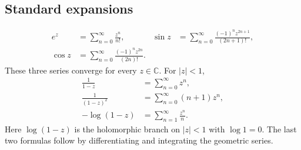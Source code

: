 \documentclass[11pt,a4paper]{article}
\theoremstyle{definition}
\theoremstyle{plain}
\newcommand{\C}{\mathbb{C}}
\begin{document}
\subsection{Standard expansions}
\begin{equation}\label{eq:17}
\begin{aligned}
 e^z&=\sum_{n=0}^{\infty}\frac{z^n}{n!},
 &\sin z&=\sum_{n=0}^{\infty}\frac{(-1)^nz^{2n+1}}{(2n+1)!},\\
 \cos z&=\sum_{n=0}^{\infty}\frac{(-1)^nz^{2n}}{(2n)!}.
\end{aligned}
\end{equation}
These three series converge for every $z\in\C$. For $|z|<1$,
\begin{equation}\label{eq:18}
\begin{aligned}
 \frac1{1-z}&=\sum_{n=0}^{\infty}z^n,\\
 \frac1{(1-z)^2}&=\sum_{n=0}^{\infty}(n+1)z^n,\\
 -\log(1-z)&=\sum_{n=1}^{\infty}\frac{z^n}{n}.
\end{aligned}
\end{equation}
Here $\log(1-z)$ is the holomorphic branch on $|z|<1$ with
$\log1=0$. The last two formulas follow by differentiating and
integrating the geometric series.
\end{document}
